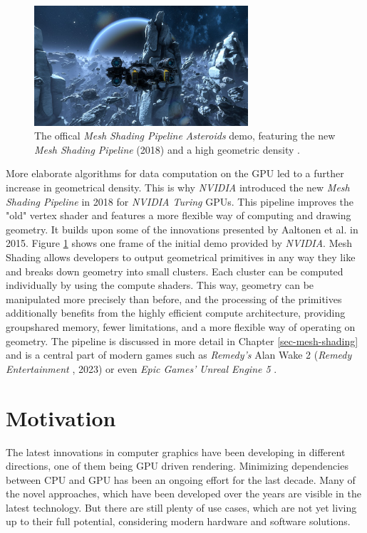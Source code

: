 \begin{figure}[h]
    \centering
    \includegraphics[width=300px]{images/graphics/mesh-shading-asteroids-demo.jpg}
    \caption{The offical \emph{Mesh Shading Pipeline} \emph{Asteroids} demo, featuring the new \emph{Mesh Shading Pipeline} (2018)
    and a high geometric density \cite{Kraemer2018}.}
    \label{fig:mesh-shading-asteroids-demo}
\end{figure}

\noindent
More elaborate algorithms for data computation on the \ac{GPU} led to a further increase in geometrical density.
This is why \emph{NVIDIA} introduced the new \emph{Mesh Shading Pipeline} in 2018 for \emph{NVIDIA Turing} \ac{GPU}s.
This pipeline improves the "old" vertex shader and features a more flexible way of computing and drawing geometry. 
It builds upon some of the innovations presented by Aaltonen et al.  \cite{Aaltonen2015} in 2015. Figure 
\ref{fig:mesh-shading-asteroids-demo} shows one frame of the initial demo provided by \emph{NVIDIA}. Mesh Shading 
allows developers to output geometrical primitives in any way they like and breaks down geometry into small clusters.
Each cluster can be computed individually by using the compute shaders. This way, geometry can be manipulated more 
precisely than before, and the processing of the primitives additionally benefits from the highly efficient compute 
architecture, providing groupshared memory, fewer limitations, and a more flexible way of operating on geometry.
The pipeline is discussed in more detail in Chapter \ref{sec-mesh-shading} and is a central part of modern games 
such as \emph{Remedy's} Alan Wake 2 (\emph{Remedy Entertainment} \cite{AlanWake22023}, 2023) or even 
\emph{Epic Games'} \emph{Unreal Engine 5} \cite{Karis2021}. 


\section{Motivation} \label{sec-motivation}

The latest innovations in computer graphics have been developing in different directions,
one of them being \ac{GPU} driven rendering. Minimizing dependencies between \ac{CPU} and \ac{GPU} 
has been an ongoing effort for the last decade. Many of the novel approaches, which have been developed 
over the years are visible in the latest technology. But there are still plenty of use cases, which are 
not yet living up to their full potential, considering modern hardware and software solutions.\\


